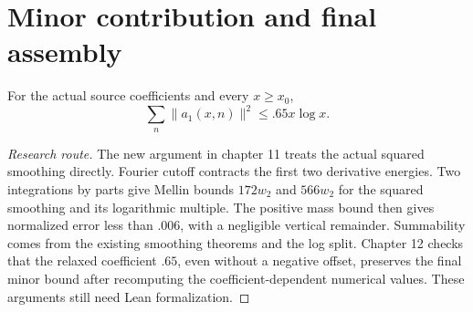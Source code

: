 \chapter{Minor contribution and final assembly}
\begin{theorem}\label{minorenergy}\notready
For the actual source coefficients and every $x\ge x_0$,
\[\sum_n\|a_1(x,n)\|^2\le .65x\log x.\]
\end{theorem}
\begin{proof}[Research route]
The new argument in chapter 11 treats the actual squared smoothing directly.
Fourier cutoff contracts the first two derivative energies. Two integrations
by parts give Mellin bounds $172w_2$ and $566w_2$ for the squared smoothing
and its logarithmic multiple. The positive mass bound then gives normalized
error less than $.006$, with a negligible vertical remainder. Summability
comes from the existing smoothing theorems and the log split. Chapter 12
checks that the relaxed coefficient $.65$, even without a negative offset,
preserves the final minor bound after recomputing the coefficient-dependent
numerical values. These arguments still need Lean formalization.
\end{proof}


